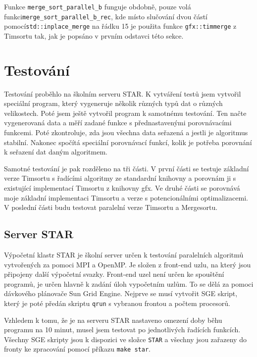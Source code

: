 \documentclass[thesis=B,czech]{FITthesis}[2019/12/23]
\begin{document}
Funkce \texttt{merge\_sort\_parallel\_b} funguje obdobně, pouze volá funkci\linebreak \texttt{merge\_sort\_parallel\_b\_rec}, kde místo slučování dvou částí pomocí\linebreak \texttt{std::inplace\_merge} na řádku 15 je použita funkce \texttt{gfx::timmerge}\cite{gfxtimsort} z Timsortu tak, jak je popsáno v prvním odstavci této sekce.

\chapter{Testování} 
Testování proběhlo na školním serveru STAR. K vytváření testů jsem vytvořil speciální program, který vygeneruje několik různých typů dat o různých velikostech. Poté jsem ještě vytvořil program k samotnému testování. Ten načte vygenerovaná data a měří zadané funkce s přednastavenými porovnávacími funkcemi. Poté zkontroluje, zda jsou všechna data seřazená a jestli je algoritmus stabilní. Nakonec spočítá speciální porovnávací funkcí, kolik je potřeba porovnání k seřazení dat daným algoritmem.

Samotné testování je pak rozděleno na tři části. V první části se testuje základní verze Timsortu s řadícími algoritmy ze standardní knihovny a porovnám ji s existující implementací Timsortu z knihovny gfx\cite{gfxtimsort}. Ve druhé části se porovnává moje základní implementaci Timsortu a verze s potencionálními optimalizacemi. V poslední části budu testovat paralelní verze Timsortu a Mergesortu.


\section{Server STAR}
Výpočetní klastr STAR je školní server určen k testování paralelních algoritmů vytvořených za pomoci MPI a OpenMP. Je složen z front-end uzlu, na který jsou připojeny další výpočetní svazky. Front-end uzel není určen ke spouštění programů, je určen hlavně k zadání úloh vypočetním uzlům. To se dělá za pomoci dávkového plánovače Sun Grid Engine. Nejprve se musí vytvořit SGE skript, který je poté předán skriptu \texttt{qrun} s vybranou frontou a počtem procesorů. \cite{runstar}

Vzhledem k tomu, že je na serveru STAR nastaveno omezení doby běhu programu na 10 minut, musel jsem testovat po jednotlivých řadících funkcích. Všechny SGE skripty jsou k dispozici ve složce \texttt{STAR} a všechny jsou zařazeny do fronty ke zpracování pomocí příkazu \texttt{make star}.
\end{document}

